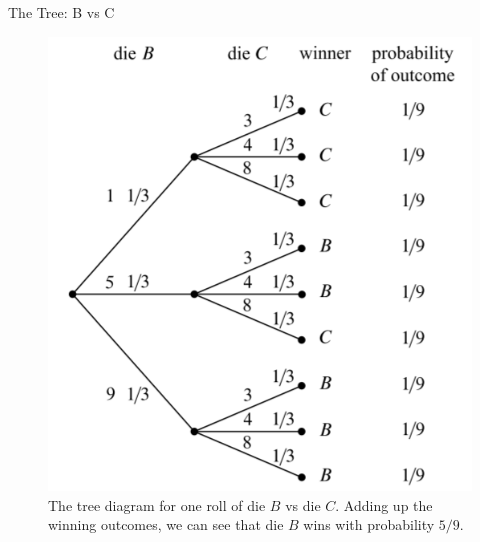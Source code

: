 \documentclass{beamer}
\begin{document}
\begin{frame}{The Tree: B vs C}
    \begin{figure}
        \centering
        \includegraphics[scale=.5]{strangebvsc.png}
        \caption{The tree diagram for one roll of die $B$ vs die $C$. Adding up the winning outcomes, we can see that die $B$ wins with probability $5/9$.}
    \end{figure}
\end{frame}
\end{document}
